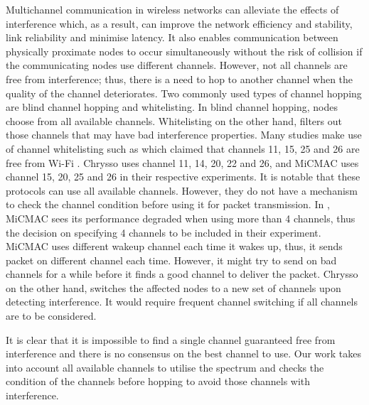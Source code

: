 Multichannel communication in wireless networks can alleviate the effects of interference which, as a result, can improve the network efficiency and stability, link reliability and minimise latency. It also enables communication between physically proximate nodes to occur simultaneously without the risk of collision if the communicating nodes use different channels. However, not all channels are free from interference; thus, there is a need to hop to another channel when the quality of the channel deteriorates. Two commonly used types of channel hopping \cite{watteyne} are blind channel hopping and whitelisting. In blind channel hopping, nodes choose from all available channels. Whitelisting on the other hand, filters out those channels that may have bad interference properties. Many studies make use of channel whitelisting such as \cite{watteyne} which claimed that channels 11, 15, 25 and 26 are free from Wi-Fi \cite{wu}. Chrysso \cite{chrysso} uses channel 11, 14, 20, 22 and 26, and MiCMAC \cite{micmac} uses channel 15, 20, 25 and 26 in their respective experiments. 
It is notable that these protocols can use all available channels. However, they do not have a mechanism to check the channel condition before using it for packet transmission. In \cite{micmac}, MiCMAC sees its performance degraded when using more than 4 channels, thus the decision on specifying 4 channels to be included in their experiment. MiCMAC uses different wakeup channel each time it wakes up, thus, it sends packet on different channel each time. However, it might try to send on bad channels for a while before it finds a good channel to deliver the packet. Chrysso on the other hand, switches the affected nodes to a new set of channels upon detecting interference. It would require frequent channel switching if all channels are to be considered.

It is clear that it is impossible to find a single channel guaranteed free from interference and there is no consensus on the best channel to use. Our work takes into account all available channels to utilise the spectrum and checks the condition of the channels before hopping to avoid those channels with interference.

